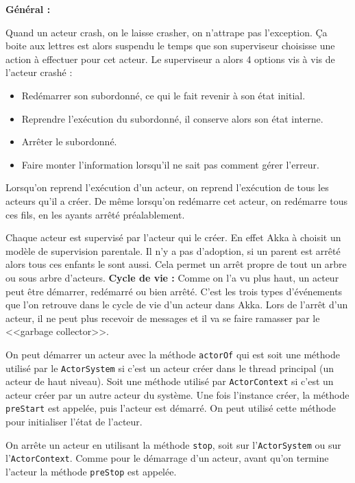 \documentclass[11pt, a4paper]{article}
\begin{document}
\newline
\textbf{Général :}
\par Quand un acteur crash, on le laisse crasher, on n'attrape pas l'exception. Ça boite aux lettres est alors suspendu le temps que son superviseur choisisse une action à effectuer pour cet acteur. Le superviseur a alors 4 options vis à vis de l'acteur crashé :
\begin{itemize}
\item Redémarrer son subordonné, ce qui le fait revenir à son état initial.
\item Reprendre l’exécution du subordonné, il conserve alors son état interne.
\item Arrêter le subordonné.
\item Faire monter l'information lorsqu'il ne sait pas comment gérer l'erreur.
\end{itemize}
Lorsqu'on reprend l’exécution d'un acteur, on reprend l'exécution de tous les acteurs qu'il a créer. De même lorsqu'on redémarre cet acteur, on redémarre tous ces fils, en les ayants arrêté préalablement.
\par Chaque acteur est supervisé par l'acteur qui le créer. En effet Akka à choisit un modèle de supervision parentale. Il n'y a pas d'adoption, si un parent est arrêté alors tous ces enfants le sont aussi. Cela permet un arrêt propre de tout un arbre ou sous arbre d'acteurs.
\newline
\newline
\textbf{Cycle de vie :}
Comme on l'a vu plus haut, un acteur peut être démarrer, redémarré ou bien arrêté. C'est les trois types d’événements que l'on retrouve dans le cycle de vie d'un acteur dans Akka. Lors de l'arrêt d'un acteur, il ne peut plus recevoir de messages et il va se faire ramasser par le <<garbage collector>>.

\par On peut démarrer un acteur avec la méthode \verb!actorOf! qui est soit une méthode utilisé par le \verb!ActorSystem! si c'est un acteur créer dans le thread principal (un acteur de haut niveau). Soit une méthode utilisé par \verb!ActorContext! si c'est un acteur créer par un autre acteur du système. Une fois l'instance créer, la méthode \verb!preStart! est appelée, puis l'acteur est démarré. On peut utilisé cette méthode pour initialiser l'état de l'acteur.

\par On arrête un acteur en utilisant la méthode \verb!stop!, soit sur l'\verb!ActorSystem! ou sur l'\verb!ActorContext!. Comme pour le démarrage d'un acteur, avant qu'on termine l'acteur la méthode \verb!preStop! est appelée. 	 
\end{document}
